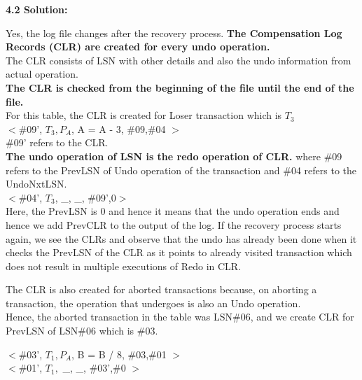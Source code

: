   \textbf{4.2 Solution:}

  Yes, the log file changes after the recovery process. \textbf{The Compensation Log Records (CLR) are created for every undo operation.}\\
  The CLR consists of LSN with other details and also the undo information from actual operation.\\
  \textbf{The CLR is checked from the beginning of the file until the end of the file.}\\
  For this table, the CLR is created for Loser transaction which is $T_3$\\
  $<$\#09', $T_3, P_A$, A = A - 3, \#09,\#04 $>$\\
  \#09' refers to the CLR.\\
 
  \textbf{The undo operation of LSN is the redo operation of CLR.}
  where \#09 refers to the PrevLSN of Undo operation of the transaction and \#04 refers to the UndoNxtLSN.\\

  $<$\#04', $T_3$, \_, \_, \#09',0$>$\\
  Here, the PrevLSN is 0 and hence it means that the undo operation ends and hence we add PrevCLR to the output of the log.
  If the recovery process starts again, we see the CLRs and observe that the undo has already been done when it checks the PrevLSN of the CLR as it points to already visited transaction which does not result in multiple executions of Redo in CLR.
  

  The CLR is also created for aborted transactions because, on aborting a transaction, the operation that undergoes is also an Undo operation.\\
  Hence, the aborted transaction in the table was LSN\#06, and we create CLR for PrevLSN of LSN\#06 which is \#03.

  $<$\#03', $T_1, P_A$, B = B / 8, \#03,\#01 $>$\\
  $<$\#01', $T_1,$ \_, \_, \#03',\#0 $>$\\



